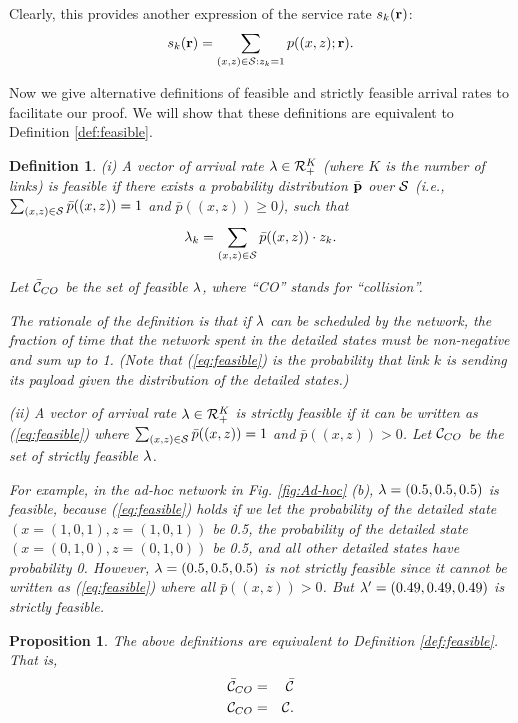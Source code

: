 \documentclass{IEEEtran}
\newtheorem{definitn}{Definition}
\newtheorem{prop}{Proposition}
\begin{document}
Clearly, this provides another expression of the service rate $s_{k}({\bf r})$:\begin{equation}
s_{k}({\bf r})=\sum_{(x,z)\in{\cal S}:z_{k}=1}p((x,z);{\bf r}).\label{eq:detailed-state-s_k}\end{equation}
\medskip{}


Now we give alternative definitions of feasible and strictly feasible
arrival rates to facilitate our proof. We will show that these definitions
are equivalent to Definition \ref{def:feasible}.
\begin{definitn}
\label{def:C-Cbar-CO}(i) A vector of arrival rate ${\bf \lambda}\in{\cal R}_{+}^{K}$
(where $K$ is the number of links) is \emph{feasible} if there exists
a probability distribution $\bar{{\bf p}}$ over ${\cal S}$ (i.e.,
$\sum_{(x,z)\in{\cal S}}\bar{p}((x,z))=1$ and $\bar{p}((x,z))\ge0$),
such that \begin{equation}
\lambda_{k}=\sum_{(x,z)\in{\cal S}}\bar{p}((x,z))\cdot z_{k}.\label{eq:feasible}\end{equation}


Let $\bar{{\cal C}}_{CO}$ be the set of feasible ${\bf \lambda}$,
where {}``CO'' stands for {}``collision''.

The rationale of the definition is that if ${\bf \lambda}$ can be
scheduled by the network, the fraction of time that the network spent
in the detailed states must be non-negative and sum up to 1. (Note
that (\ref{eq:feasible}) is the probability that link $k$ is sending
its payload given the distribution of the detailed states.)

(ii) A vector of arrival rate ${\bf \lambda}\in{\cal R}_{+}^{K}$
is \emph{strictly feasible} if it can be written as (\ref{eq:feasible})
where $\sum_{(x,z)\in{\cal S}}\bar{p}((x,z))=1$ and $\bar{p}((x,z))>0$.
Let ${\cal C}_{CO}$ be the set of strictly feasible ${\bf \lambda}$. 

For example, in the ad-hoc network in Fig. \ref{fig:Ad-hoc} (b),
${\bf \lambda}=(0.5,0.5,0.5)$ is feasible, because (\ref{eq:feasible})
holds if we let the probability of the detailed state $(x=(1,0,1),z=(1,0,1))$
be 0.5, the probability of the detailed state $(x=(0,1,0),z=(0,1,0))$
be 0.5, and all other detailed states have probability 0. However,
${\bf \lambda}=(0.5,0.5,0.5)$ is not strictly feasible since it cannot
be written as (\ref{eq:feasible}) where all $\bar{p}((x,z))>0$.
But ${\bf \lambda}'=(0.49,0.49,0.49)$ is strictly feasible.\medskip{}
\end{definitn}
\begin{prop}
The above definitions are equivalent to Definition \ref{def:feasible}.
That is,\begin{eqnarray}
\bar{{\cal C}}_{CO} & = & \bar{{\cal C}}\label{eq:eq_Cbar}\\
{\cal C}_{CO} & = & {\cal C}.\label{eq:eq_C}\end{eqnarray}
\end{prop}
\end{document}
